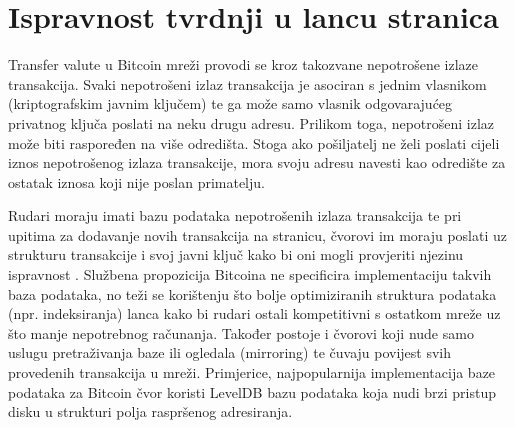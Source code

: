 \documentclass[utf8, zavrsni]{fer}
\begin{document}
\section{Ispravnost tvrdnji u lancu stranica}

Transfer valute u Bitcoin mreži provodi se kroz takozvane nepotrošene izlaze transakcija\footnotemark. Svaki nepotrošeni izlaz transakcija je asociran s jednim vlasnikom (kriptografskim javnim ključem) te ga može samo vlasnik odgovarajućeg privatnog ključa poslati na neku drugu adresu. Prilikom toga, nepotrošeni izlaz može biti raspoređen na više odredišta. Stoga ako pošiljatelj ne želi poslati cijeli iznos nepotrošenog izlaza transakcije, mora svoju adresu navesti kao odredište za ostatak iznosa koji nije poslan primatelju.

Rudari moraju imati bazu podataka nepotrošenih izlaza transakcija te pri upitima za dodavanje novih transakcija na stranicu, čvorovi im moraju poslati uz strukturu transakcije i svoj javni ključ kako bi oni mogli provjeriti njezinu ispravnost \footnotemark. Službena propozicija Bitcoina ne specificira implementaciju takvih baza podataka, no teži se korištenju što bolje optimiziranih struktura podataka (npr. indeksiranja) lanca kako bi rudari ostali kompetitivni s ostatkom mreže uz što manje nepotrebnog računanja. Također postoje i čvorovi koji nude samo uslugu pretraživanja baze ili ogledala (mirroring) te čuvaju povijest svih provedenih transakcija u mreži. Primjerice, najpopularnija implementacija baze podataka za Bitcoin čvor koristi LevelDB bazu podataka koja nudi brzi pristup disku u strukturi polja raspršenog adresiranja.
\end{document}
